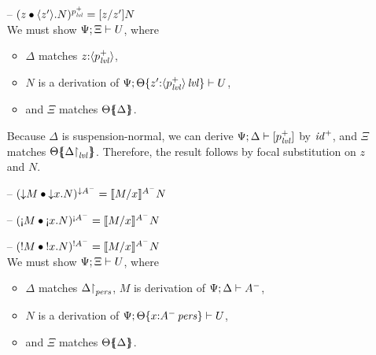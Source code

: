 \begin{itemize}
\item[--] $(\subst{z}{\tetap{z'}{N}})^{p^+_{\mlvl}} = [z/z']N$\smallskip\\
  We must show $\foc{\Psi}{\Xi}{U}$, where 
  \begin{itemize}
   \item $\Delta$ matches $z{:}\susp{p^+_\mlvl}$,
   \item 
      $N$ is a derivation of 
      $\foc{\Psi}{\tackon{\Theta}{z'{:}\islvl{\susp{p^+_\mlvl}}}}{U}$,
   \item and $\Xi$ matches $\frameoff{\Theta}{\Delta}$.
  \end{itemize}
  Because $\Delta$ is suspension-normal, 
  we can derive $\foc{\Psi}{\Delta}{[p^+_\mlvl]}$ by ${\it
    id}^+$, and
  $\Xi$ matches 
  $\frameoff{\Theta}{\restrictto{\Delta}{\mlvl}}$.
  Therefore, the result follows by focal substitution on $z$ and $N$. 

\smallskip
 
\item[--] $(\subst{\tdownr{M}}{\tdownl{x}{N}})^{{\downarrow}A^-} 
           = \rsubsta{M}{x}{N}{A^-}$ %



\item[--] $(\subst{\tgnabr{M}}{\tgnabl{x}{N}})^{{\scriptgnab}A^-}
           = \rsubsta{M}{x}{N}{A^-}$

\item[--] $(\subst{\tbangr{M}}{\tbangl{x}{N}})^{{!}A^-}
           = \rsubsta{M}{x}{N}{A^-}$ \smallskip\\
  We must show $\foc{\Psi}{\Xi}{U}$, where
  \begin{itemize}
  \item $\Delta$ matches $\restrictto{\Delta}{\mpers}$,
        $M$ is derivation of $\foc{\Psi}{\Delta}{A^-}$, 
  \item $N$ is a derivation of 
        $\foc{\Psi}{\tackon{\Theta}{x{:}\ispers{A^-}}}{U}$,
  \item and $\Xi$ matches $\frameoff{\Theta}{\Delta}$.
  \end{itemize}


\end{itemize}
